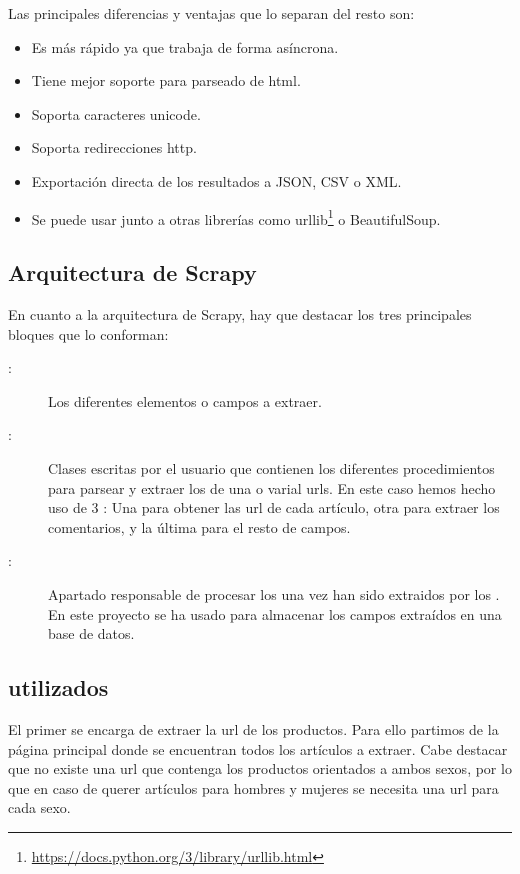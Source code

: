 Las principales diferencias y ventajas que lo separan del resto son:
\begin{itemize}
    \item Es más rápido ya que trabaja de forma asíncrona.
    \item Tiene mejor soporte para parseado de html.
    \item Soporta caracteres unicode.
    \item Soporta redirecciones http.
    \item Exportación directa de los resultados a JSON, CSV o XML.
    \item Se puede usar junto a otras librerías como urllib\footnote{\url{https://docs.python.org/3/library/urllib.html}} o BeautifulSoup.
\end{itemize}

\subsection{Arquitectura de Scrapy}

En cuanto a la arquitectura de Scrapy, hay que destacar los tres principales bloques que lo conforman:

\begin{description}
    \item[:] Los diferentes elementos o campos a extraer.
    \item[:] Clases escritas por el usuario que contienen los diferentes procedimientos para parsear y extraer los  de una o varial urls. En este caso hemos hecho uso de 3 : Una para obtener las url de cada artículo, otra para extraer los comentarios, y la última para el resto de campos.
    \item[:] Apartado responsable de procesar los  una vez han sido extraidos por los . En este proyecto se ha usado para almacenar los campos extraídos en una base de datos.
\end{description}


\subsection{ utilizados}
El primer  se encarga de extraer la url de los productos. Para ello partimos de la página principal donde se encuentran todos los artículos a extraer. Cabe destacar que no existe una url que contenga los productos orientados a ambos sexos, por lo que en caso de querer artículos para hombres y mujeres se necesita una url para cada sexo.

